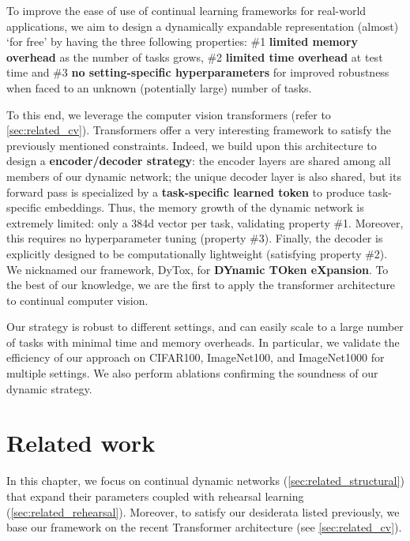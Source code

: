 To improve the ease of use of continual learning frameworks for real-world applications, we aim to
design a dynamically expandable representation (almost) `for free' by having the three following
properties: \#1 \textbf{limited memory overhead} as the number of tasks grows, \#2 \textbf{limited
    time overhead} at test time and \#3 \textbf{no setting-specific hyperparameters} for improved
robustness when faced to an unknown (potentially large) number of tasks.

To this end, we leverage the computer vision transformers (refer to \autoref{sec:related_cv}).
Transformers \citep{vaswani2017transformer} offer a very interesting framework to satisfy the
previously mentioned constraints. Indeed, we build upon this architecture to design a
\textbf{encoder/decoder strategy}: the encoder layers are shared among all members of our dynamic
network; the unique decoder layer is also shared, but its forward pass is specialized by a
\textbf{task-specific learned token} to produce task-specific embeddings. Thus, the memory growth of
the dynamic network is extremely limited: only a 384d vector per task, validating property \#1.
Moreover, this requires no hyperparameter tuning (property \#3). Finally, the decoder is explicitly
designed to be computationally lightweight (satisfying property \#2). We nicknamed our framework,
DyTox, for \textbf{DYnamic TOken eXpansion}. To the best of our knowledge, we are the first to apply
the transformer architecture to continual computer vision.

Our strategy is robust to different settings, and can easily scale to a large number of tasks with
minimal time and memory overheads. In particular, we validate the efficiency of our approach on
CIFAR100, ImageNet100, and ImageNet1000 for multiple settings. We also perform ablations confirming
the soundness of our dynamic strategy.

\section{Related work}
\label{sec:dytox_related}

In this chapter, we focus on continual dynamic networks
(\autoref{sec:related_structural}) that expand their parameters coupled with rehearsal learning
(\autoref{sec:related_rehearsal}). Moreover, to satisfy our desiderata listed previously, we base
our framework on the recent Transformer architecture (see \autoref{sec:related_cv}).

